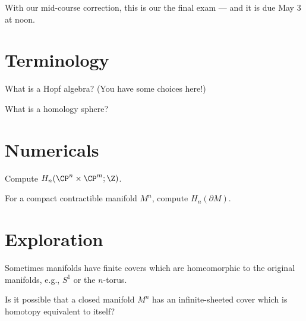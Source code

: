 \documentclass{homework}
\author{Jim Fowler}
\begin{document}
\maketitle

\begin{inspiration}
  With our mid-course correction, this is our the final exam --- and it is due May 3 at noon.
\end{inspiration}

\section{Terminology}

\begin{problem}
  What is a Hopf algebra?  (You have some choices here!)
\end{problem}

\begin{problem}
 What is a homology sphere? 
\end{problem}

\section{Numericals}

\begin{problem}
  Compute $H_n(\CP^n \times \CP^m; \Z)$.
\end{problem}

\begin{problem}
  For a compact contractible manifold $M^n$, compute $H_n(\partial M)$.
\end{problem}

\section{Exploration}



\begin{problem}
  Sometimes manifolds have finite covers which are homeomorphic to the
  original manifolds, e.g., $S^1$ or the $n$-torus.

  Is it possible that a closed manifold $M^n$ has an infinite-sheeted
  cover which is homotopy equivalent to itself?
\end{problem}
\end{document}
